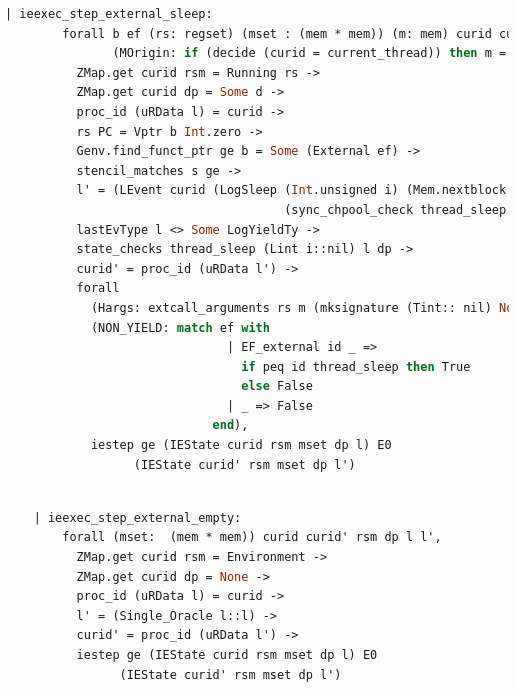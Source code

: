 \begin{lstlisting}[language=Caml]
    | ieexec_step_external_sleep:
        forall b ef (rs: regset) (mset : (mem * mem)) (m: mem) curid curid' rsm s l l' dp d i
               (MOrigin: if (decide (curid = current_thread)) then m = fst mset else m = snd mset),
          ZMap.get curid rsm = Running rs ->
          ZMap.get curid dp = Some d ->
          proc_id (uRData l) = curid ->
          rs PC = Vptr b Int.zero ->
          Genv.find_funct_ptr ge b = Some (External ef) ->
          stencil_matches s ge ->
          l' = (LEvent curid (LogSleep (Int.unsigned i) (Mem.nextblock m)
                                       (sync_chpool_check thread_sleep ((Lint i)::nil) (uRData l) d))::l) ->
          lastEvType l <> Some LogYieldTy ->
          state_checks thread_sleep (Lint i::nil) l dp ->
          curid' = proc_id (uRData l') ->
          forall
            (Hargs: extcall_arguments rs m (mksignature (Tint:: nil) None cc_default) (Vint i:: nil))
            (NON_YIELD: match ef with
                               | EF_external id _ => 
                                 if peq id thread_sleep then True
                                 else False
                               | _ => False
                             end),
            iestep ge (IEState curid rsm mset dp l) E0
                  (IEState curid' rsm mset dp l')
\end{lstlisting}

\begin{lstlisting}[language=Caml]

    | ieexec_step_external_empty:
        forall (mset:  (mem * mem)) curid curid' rsm dp l l',
          ZMap.get curid rsm = Environment ->
          ZMap.get curid dp = None ->
          proc_id (uRData l) = curid ->
          l' = (Single_Oracle l::l) ->
          curid' = proc_id (uRData l') ->
          iestep ge (IEState curid rsm mset dp l) E0
                (IEState curid' rsm mset dp l')
\end{lstlisting}


